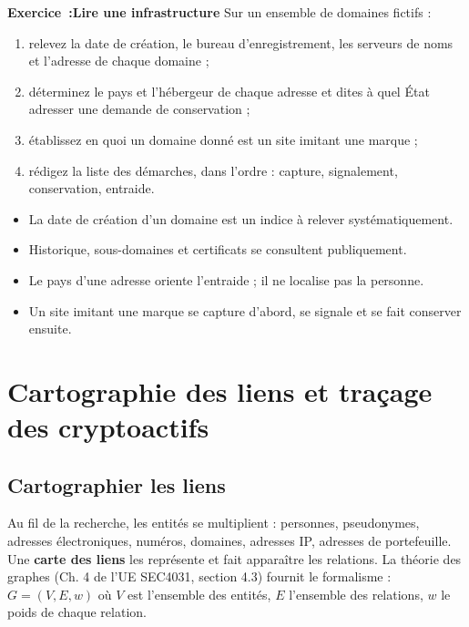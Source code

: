 \begin{boxexo}
\textbf{Exercice~:Lire une infrastructure}
Sur un ensemble de domaines fictifs :
\begin{enumerate}
\item relevez la date de création, le bureau d'enregistrement, les serveurs de noms et l'adresse de chaque domaine ;
\item déterminez le pays et l'hébergeur de chaque adresse et dites à quel État adresser une demande de conservation ;
\item établissez en quoi un domaine donné est un site imitant une marque ;
\item rédigez la liste des démarches, dans l'ordre : capture, signalement, conservation, entraide.
\end{enumerate}
\end{boxexo}

\begin{boxresume}
\begin{itemize}
\item La date de création d'un domaine est un indice à relever systématiquement.
\item Historique, sous-domaines et certificats se consultent publiquement.
\item Le pays d'une adresse oriente l'entraide ; il ne localise pas la personne.
\item Un site imitant une marque se capture d'abord, se signale et se fait conserver ensuite.
\end{itemize}
\end{boxresume}

\section{Cartographie des liens et traçage des cryptoactifs}

\subsection{Cartographier les liens}

Au fil de la recherche, les entités se multiplient : personnes, pseudonymes, adresses électroniques, numéros, domaines, adresses IP, adresses de portefeuille. Une \textbf{carte des liens} les représente et fait apparaître les relations. La théorie des graphes (Ch. 4 de l'UE SEC4031, section 4.3) fournit le formalisme : $G = (V, E, w)$ où $V$ est l'ensemble des entités, $E$ l'ensemble des relations, $w$ le poids de chaque relation.

